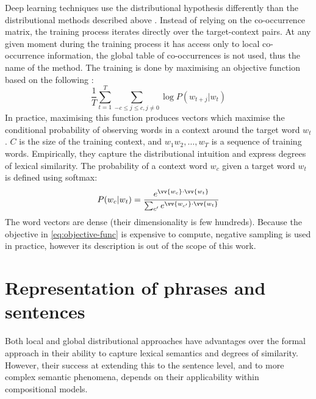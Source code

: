 Deep learning\footnotemark{} techniques use the distributional hypothesis differently than the distributional methods described above \cite{Goldberg2016}. Instead of relying on the co-occurrence matrix, the training process iterates directly over the target-context pairs. At any given moment during the training process it has access only to local co-occurrence information, the global table of co-occurrences is not used, thus the name of the method. The training is done by maximising an objective function based on the following \cite{mikolov2013linguistic,mikolov2013distributed,mikolov2013efficient}:
%
\begin{equation}
 \frac{1}{T}\sum^{T}_{t=1}\sum_{-c \leq j \leq c, j\neq0} \log P(w_{t+j}|w_t)
  \label{eq:objective-func}
\end{equation}
%
In practice, maximising this function produces vectors which maximise the conditional probability of observing words in a context around the target word $w_t$. $C$ is the size of the training context, and $w_1 w_2, \ldots, w_T$ is a sequence of training words. Empirically, they capture the distributional intuition and express degrees of lexical similarity. The probability of a context word $w_c$ given a target word $w_t$ is defined using softmax:
%
\begin{equation*}
  P(w_c|w_{t}) = \frac{e^{\vv{w_c} \cdot \vv{w_t}}}{\sum_{c'}e^{\vv{w_{c'}} \cdot \vv{w_t}}}
\end{equation*}
%
The word vectors are dense (their dimensionality is few hundreds). Because the objective in \eqref{eq:objective-func} is expensive to compute, negative sampling is used in practice, however its description is out of the scope of this work.

\section{Representation of phrases and sentences}
\label{sec:similarity-compounds}

Both local and global distributional approaches have advantages over the formal approach in their ability to capture lexical semantics and degrees of similarity. However, their success at extending this to the sentence level, and to more complex semantic phenomena, depends on their applicability within compositional models.


